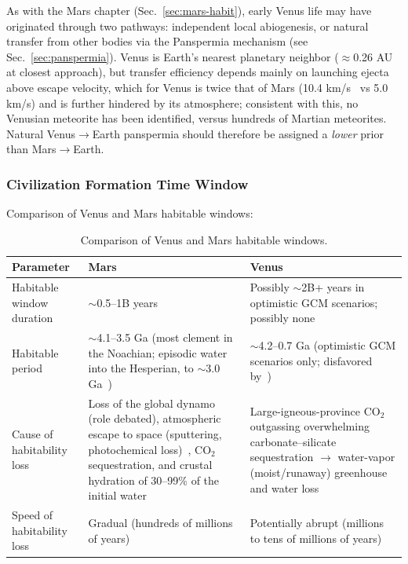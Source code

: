 \documentclass[aps,prd,twocolumn,superscriptaddress,nofootinbib]{revtex4-2}
\begin{document}
As with the Mars chapter (Sec.~\ref{sec:mars-habit}), early Venus life may have originated through two pathways: independent local abiogenesis, or natural transfer from other bodies via the Panspermia mechanism (see Sec.~\ref{sec:panspermia}). Venus is Earth's nearest planetary neighbor ($\approx$0.26 AU at closest approach), but transfer efficiency depends mainly on launching ejecta above escape velocity, which for Venus is twice that of Mars (10.4 km/s~\cite{NASA_Venus_Fact} vs 5.0 km/s) and is further hindered by its atmosphere; consistent with this, no Venusian meteorite has been identified, versus hundreds of Martian meteorites. Natural Venus$\to$Earth panspermia should therefore be assigned a \textit{lower} prior than Mars$\to$Earth.

\subsubsection{Civilization Formation Time Window}\label{sec:venus-window}

Comparison of Venus and Mars habitable windows:

\begin{table}[htbp]
\caption{Comparison of Venus and Mars habitable windows.}
\label{tab:venus-mars}
\footnotesize
\begin{tabular}{P{0.196\textwidth}P{0.350\textwidth}P{0.350\textwidth}}
\toprule
Parameter & Mars & Venus \\
\midrule
Habitable window duration & ${\sim}$0.5--1B years & Possibly ${\sim}$2B+ years in optimistic GCM scenarios; possibly none~\cite{Constantinou2024,Turbet2021,Warren2023} \\
Habitable period & ${\sim}$4.1--3.5 Ga (most clement in the Noachian; episodic water into the Hesperian, to ${\sim}$3.0 Ga~\cite{Carr2010}) & ${\sim}$4.2--0.7 Ga (optimistic GCM scenarios only; disfavored by~\cite{Constantinou2024,Turbet2021,Warren2023}) \\
Cause of habitability loss & Loss of the global dynamo (role debated), atmospheric escape to space (sputtering, photochemical loss)~\cite{Jakosky2018}, CO$_{2}$ sequestration, and crustal hydration of 30--99\% of the initial water~\cite{Scheller2021} & Large-igneous-province CO$_{2}$ outgassing overwhelming carbonate--silicate sequestration $\to$ water-vapor (moist/runaway) greenhouse and water loss~\cite{Way2020} \\
Speed of habitability loss & Gradual (hundreds of millions of years) & Potentially abrupt (millions to tens of millions of years) \\
\bottomrule
\end{tabular}
\end{table}
\end{document}
